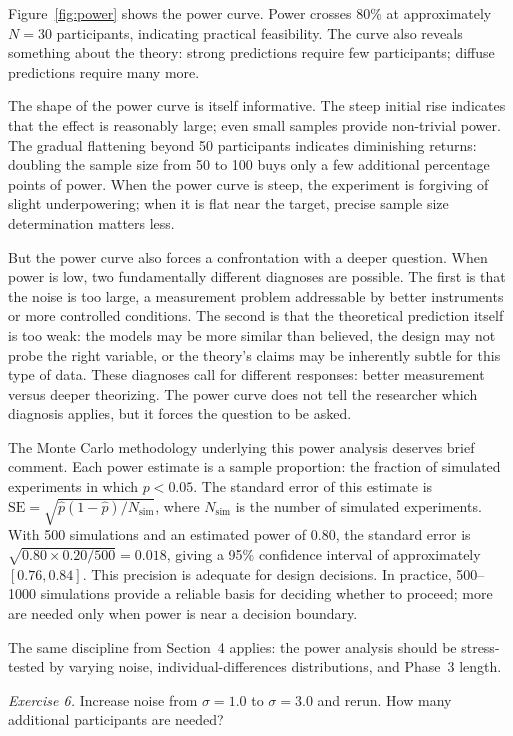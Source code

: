 \documentclass[fleqn,10pt]{wlscirep}
\begin{document}
\begin{linenumbers}
Figure~\ref{fig:power} shows the power curve. Power crosses 80\% at approximately $N = 30$ participants, indicating practical feasibility. The curve also reveals something about the theory: strong predictions require few participants; diffuse predictions require many more.

The shape of the power curve is itself informative. The steep initial rise indicates that the effect is reasonably large; even small samples provide non-trivial power. The gradual flattening beyond 50 participants indicates diminishing returns: doubling the sample size from 50 to 100 buys only a few additional percentage points of power. When the power curve is steep, the experiment is forgiving of slight underpowering; when it is flat near the target, precise sample size determination matters less.

But the power curve also forces a confrontation with a deeper question. When power is low, two fundamentally different diagnoses are possible. The first is that the noise is too large, a measurement problem addressable by better instruments or more controlled conditions. The second is that the theoretical prediction itself is too weak: the models may be more similar than believed, the design may not probe the right variable, or the theory's claims may be inherently subtle for this type of data. These diagnoses call for different responses: better measurement versus deeper theorizing. The power curve does not tell the researcher which diagnosis applies, but it forces the question to be asked.

The Monte Carlo methodology underlying this power analysis deserves brief comment. Each power estimate is a sample proportion: the fraction of simulated experiments in which $p < 0.05$. The standard error of this estimate is $\text{SE} = \sqrt{\hat{p}(1-\hat{p})/N_{\text{sim}}}$, where $N_{\text{sim}}$ is the number of simulated experiments. With 500 simulations and an estimated power of 0.80, the standard error is $\sqrt{0.80 \times 0.20 / 500} = 0.018$, giving a 95\% confidence interval of approximately $[0.76, 0.84]$. This precision is adequate for design decisions. In practice, 500--1000 simulations provide a reliable basis for deciding whether to proceed; more are needed only when power is near a decision boundary.

The same discipline from Section~4 applies: the power analysis should be stress-tested by varying noise, individual-differences distributions, and Phase~3 length.

\emph{Exercise 6.} Increase noise from $\sigma = 1.0$ to $\sigma = 3.0$ and rerun. How many additional participants are needed?


\end{linenumbers}
\end{document}
